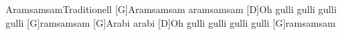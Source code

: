 \documentclass[../main.tex]{subfiles}
\begin{document}
\begin{songwithoutpagebreak}{Aramsamsam}{Traditionell}{}
[G]Aramsamsam aramsamsam
[D]Oh gulli gulli gulli gulli [G]ramsamsam
[G]Arabi arabi
[D]Oh gulli gulli gulli gulli [G]ramsamsam
\end{songwithoutpagebreak}
\end{document}
